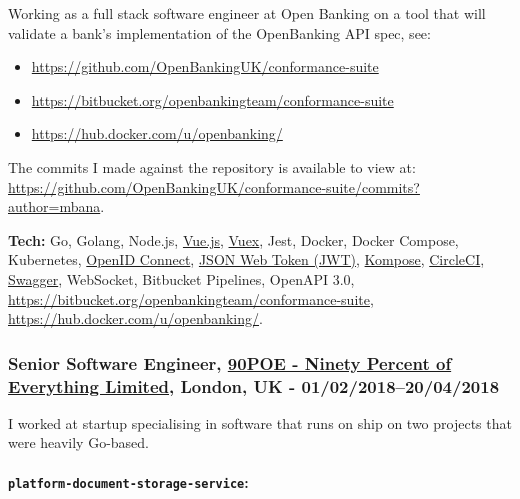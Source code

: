 \documentclass[
  a4paper,
]{article}
\providecommand{\tightlist}{%
  \setlength{\itemsep}{0pt}\setlength{\parskip}{0pt}}
\begin{document}
\begin{multicols*}{2}
Working as a full stack software engineer at Open Banking on a tool that
will validate a bank's implementation of the OpenBanking API spec, see:

\begin{itemize}
\tightlist
\item
  \url{https://github.com/OpenBankingUK/conformance-suite}
\item
  \url{https://bitbucket.org/openbankingteam/conformance-suite}
\item
  \url{https://hub.docker.com/u/openbanking/}
\end{itemize}

The commits I made against the repository is available to view at:
\url{https://github.com/OpenBankingUK/conformance-suite/commits?author=mbana}.

\textbf{Tech:} Go, Golang, Node.js, \href{https://vuejs.org/}{Vue.js},
\href{https://vuex.vuejs.org/}{Vuex}, Jest, Docker, Docker Compose,
Kubernetes, \href{https://openid.net/connect/}{OpenID Connect},
\href{https://jwt.io/}{JSON Web Token (JWT)},
\href{http://kompose.io/}{Kompose},
\href{https://circleci.com/}{CircleCI},
\href{https://swagger.io/}{Swagger}, WebSocket, Bitbucket Pipelines,
OpenAPI 3.0,
\url{https://bitbucket.org/openbankingteam/conformance-suite},
\url{https://hub.docker.com/u/openbanking/}.

\hypertarget{senior-software-engineer-90poe---ninety-percent-of-everything-limited-london-uk---0102201820042018}{%
\subsubsection{\texorpdfstring{Senior Software Engineer,
\href{https://www.90poe.io/}{90POE - Ninety Percent of Everything
Limited}, London, UK -
01/02/2018--20/04/2018}{Senior Software Engineer, 90POE - Ninety Percent of Everything Limited, London, UK - 01/02/2018--20/04/2018}}\label{senior-software-engineer-90poe---ninety-percent-of-everything-limited-london-uk---0102201820042018}}

I worked at startup specialising in software that runs on ship on two
projects that were heavily Go-based.

\hypertarget{platform-document-storage-service}{%
\paragraph{\texorpdfstring{\textbf{\texttt{platform-document-storage-service}}:}{platform-document-storage-service:}}\label{platform-document-storage-service}}


\end{multicols*}
\end{document}
